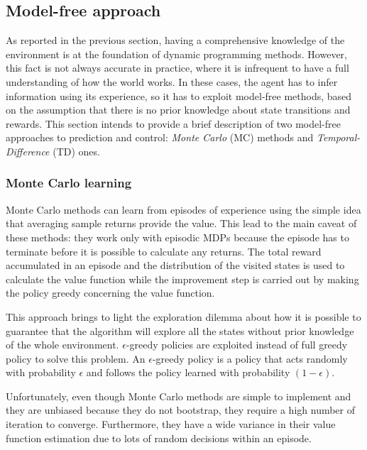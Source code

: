 \subsection{Model-free approach} \label{mfa}

As reported in the previous section, having a comprehensive knowledge of the environment is at the foundation of dynamic programming methods. However, this fact is not always accurate in practice, where it is infrequent to have a full understanding of how the world works. In these cases, the agent has to infer information using its experience, so it has to exploit model-free methods, based on the assumption that there is no prior knowledge about state transitions and rewards.
This section intends to provide a brief description of two model-free approaches to prediction and control: \textit{Monte Carlo} (MC) methods and \textit{Temporal-Difference} (TD) ones.

\subsubsection{Monte Carlo learning}

Monte Carlo methods \cite[Chapter 6]{sutton2018reinforcement} can learn from episodes of experience using the simple idea that averaging sample returns provide the value. This lead to the main caveat of these methods: they work only with episodic MDPs because the episode has to terminate before it is possible to calculate any returns.
The total reward accumulated in an episode and the distribution of the visited states is used to calculate the value function while the improvement step is carried out by making the policy greedy concerning the value function.

This approach brings to light the exploration dilemma about how it is possible to guarantee that the algorithm will explore all the states without prior knowledge of the whole environment. $\epsilon$-greedy policies are exploited instead of full greedy policy to solve this problem.
An $\epsilon$-greedy policy is a policy that acts randomly with probability $\epsilon$ and follows the policy learned with probability $(1-\epsilon)$.

Unfortunately, even though Monte Carlo methods are simple to implement and they are unbiased because they do not bootstrap, they require a high number of iteration to converge. Furthermore, they have a wide variance in their value function estimation due to lots of random decisions within an episode.

